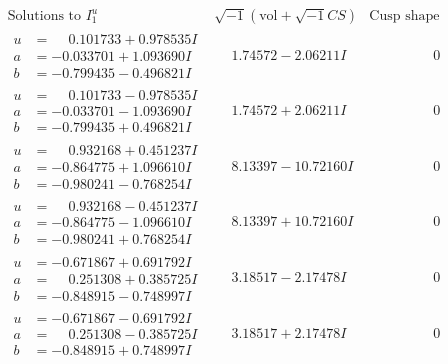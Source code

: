 \documentclass[1p]{elsarticle_modified}
\theoremstyle{definition}
\newcommand{\I}{\sqrt{-1}}
\begin{document}
$$\begin{array}{c|c|c}  
\text{Solutions to }I^u_{1}& \I (\text{vol} + \sqrt{-1}CS) & \text{Cusp shape}\\
 \hline 
\begin{aligned}
u &= \phantom{-}0.101733 + 0.978535 I \\
a &= -0.033701 + 1.093690 I \\
b &= -0.799435 - 0.496821 I\end{aligned}
 & \phantom{-}1.74572 - 2.06211 I & \phantom{-0.000000 } 0 \\ \hline\begin{aligned}
u &= \phantom{-}0.101733 - 0.978535 I \\
a &= -0.033701 - 1.093690 I \\
b &= -0.799435 + 0.496821 I\end{aligned}
 & \phantom{-}1.74572 + 2.06211 I & \phantom{-0.000000 } 0 \\ \hline\begin{aligned}
u &= \phantom{-}0.932168 + 0.451237 I \\
a &= -0.864775 + 1.096610 I \\
b &= -0.980241 - 0.768254 I\end{aligned}
 & \phantom{-}8.13397 - 10.72160 I & \phantom{-0.000000 } 0 \\ \hline\begin{aligned}
u &= \phantom{-}0.932168 - 0.451237 I \\
a &= -0.864775 - 1.096610 I \\
b &= -0.980241 + 0.768254 I\end{aligned}
 & \phantom{-}8.13397 + 10.72160 I & \phantom{-0.000000 } 0 \\ \hline\begin{aligned}
u &= -0.671867 + 0.691792 I \\
a &= \phantom{-}0.251308 + 0.385725 I \\
b &= -0.848915 - 0.748997 I\end{aligned}
 & \phantom{-}3.18517 - 2.17478 I & \phantom{-0.000000 } 0 \\ \hline\begin{aligned}
u &= -0.671867 - 0.691792 I \\
a &= \phantom{-}0.251308 - 0.385725 I \\
b &= -0.848915 + 0.748997 I\end{aligned}
 & \phantom{-}3.18517 + 2.17478 I & \phantom{-0.000000 } 0 \\ \hline\begin{aligned}

\end{aligned}
\end{array}$$
\end{document}
